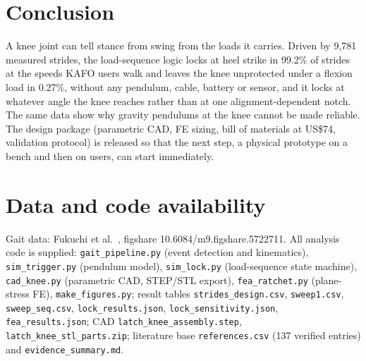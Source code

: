 \documentclass[11pt,a4paper]{article}
\begin{document}
\section{Conclusion}
A knee joint can tell stance from swing from the loads it carries. Driven by 9{,}781 measured strides, the load-sequence logic locks at heel strike in 99.2\% of strides at the speeds KAFO users walk and leaves the knee unprotected under a flexion load in 0.27\%, without any pendulum, cable, battery or sensor, and it locks at whatever angle the knee reaches rather than at one alignment-dependent notch. The same data show why gravity pendulums at the knee cannot be made reliable. The design package (parametric CAD, FE sizing, bill of materials at US\$74, validation protocol) is released so that the next step, a physical prototype on a bench and then on users, can start immediately.

\section*{Data and code availability}
Gait data: Fukuchi et al.\ \cite{fukuchi2018}, figshare 10.6084/m9.figshare.5722711. All analysis code is supplied: \texttt{gait\_pipeline.py} (event detection and kinematics), \texttt{sim\_trigger.py} (pendulum model), \texttt{sim\_lock.py} (load-sequence state machine), \texttt{cad\_knee.py} (parametric CAD, STEP/STL export), \texttt{fea\_ratchet.py} (plane-stress FE), \texttt{make\_figures.py}; result tables \texttt{strides\_design.csv}, \texttt{sweep1.csv}, \texttt{sweep\_seq.csv}, \texttt{lock\_results.json}, \texttt{lock\_sensitivity.json}, \texttt{fea\_results.json}; CAD \texttt{latch\_knee\_assembly.step}, \texttt{latch\_knee\_stl\_parts.zip}; literature base \texttt{references.csv} (137 verified entries) and \texttt{evidence\_summary.md}.
\end{document}
